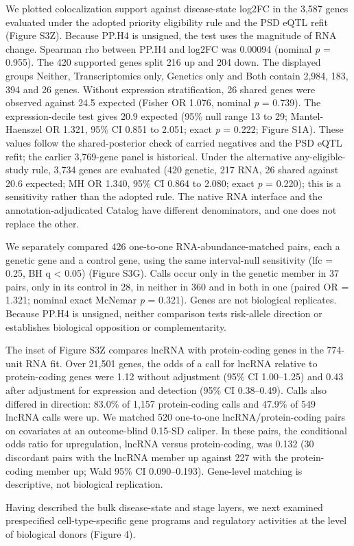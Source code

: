 We plotted colocalization support against disease-state log2FC in the 3,587 genes evaluated under the adopted priority eligibility rule and the PSD eQTL refit (Figure S3Z). Because PP.H4 is unsigned, the test uses the magnitude of RNA change. Spearman rho between PP.H4 and \textbar log2FC\textbar{} was 0.00094 (nominal \emph{p} = 0.955). The 420 supported genes split 216 up and 204 down. The displayed groups Neither, Transcriptomics only, Genetics only and Both contain 2,984, 183, 394 and 26 genes. Without expression stratification, 26 shared genes were observed against 24.5 expected (Fisher OR 1.076, nominal \emph{p} = 0.739). The expression-decile test gives 20.9 expected (95\% null range 13 to 29; Mantel-Haenszel OR 1.321, 95\% CI 0.851 to 2.051; exact \emph{p} = 0.222; Figure S1A). These values follow the shared-posterior check of carried negatives and the PSD eQTL refit; the earlier 3,769-gene panel is historical. Under the alternative any-eligible-study rule, 3,734 genes are evaluated (420 genetic, 217 RNA, 26 shared against 20.6 expected; MH OR 1.340, 95\% CI 0.864 to 2.080; exact \emph{p} = 0.220); this is a sensitivity rather than the adopted rule. The native RNA interface and the annotation-adjudicated Catalog have different denominators, and one does not replace the other.

We separately compared 426 one-to-one RNA-abundance-matched pairs, each a genetic gene and a control gene, using the same interval-null sensitivity (lfc = 0.25, BH q \textless{} 0.05) (Figure S3G). Calls occur only in the genetic member in 37 pairs, only in its control in 28, in neither in 360 and in both in one (paired OR = 1.321; nominal exact McNemar \emph{p} = 0.321). Genes are not biological replicates. Because PP.H4 is unsigned, neither comparison tests risk-allele direction or establishes biological opposition or complementarity.

The inset of Figure S3Z compares lncRNA with protein-coding genes in the 774-unit RNA fit. Over 21,501 genes, the odds of a call for lncRNA relative to protein-coding genes were 1.12 without adjustment (95\% CI 1.00--1.25) and 0.43 after adjustment for expression and detection (95\% CI 0.38--0.49). Calls also differed in direction: 83.0\% of 1,157 protein-coding calls and 47.9\% of 549 lncRNA calls were up. We matched 520 one-to-one lncRNA/protein-coding pairs on covariates at an outcome-blind 0.15-SD caliper. In these pairs, the conditional odds ratio for upregulation, lncRNA versus protein-coding, was 0.132 (30 discordant pairs with the lncRNA member up against 227 with the protein-coding member up; Wald 95\% CI 0.090--0.193). Gene-level matching is descriptive, not biological replication.

Having described the bulk disease-state and stage layers, we next examined prespecified cell-type-specific gene programs and regulatory activities at the level of biological donors (Figure 4).
